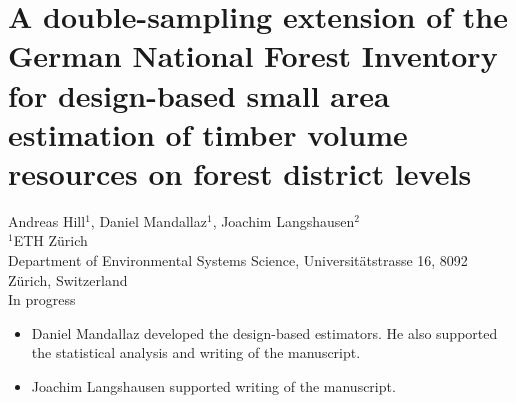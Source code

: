 \chapter{A double-sampling extension of the German National Forest Inventory for design-based small area estimation of timber volume resources on forest district levels}
\label{chap:regmod}
{\large Andreas Hill$^1$, Daniel Mandallaz$^1$, Joachim Langshausen$^2$}\\

\vspace{3cm}
\noindent
$^1$ETH Z\"urich\\Department of Environmental Systems Science, Universit\"atstrasse 16, 8092 Z\"urich, Switzerland \\

\vspace{\fill}
\noindent
In progress

\newpage
\thispagestyle{plain}
\renewcommand{\labelitemi}{--}
\begin{itemize}
	\item Daniel Mandallaz developed the design-based estimators. He also supported the statistical analysis and writing of the manuscript.
	\item Joachim Langshausen supported writing of the manuscript.
\end{itemize}

\clearpage